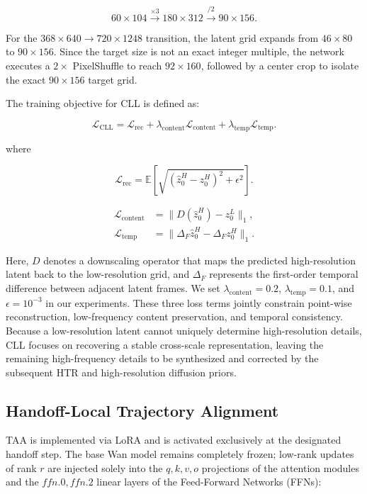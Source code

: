 \[
60\times104 \xrightarrow{\times3} 180\times312
\xrightarrow{/2} 90\times156.
\]

For the \(368\times640 \rightarrow 720\times1248\) transition, the
latent grid expands from \(46\times80\) to \(90\times156\). Since the
target size is not an exact integer multiple, the network executes a
\(2\times\) PixelShuffle to reach \(92\times160\), followed by a center
crop to isolate the exact \(90\times156\) target grid.

The training objective for CLL is defined as:

\[
\mathcal L_{\mathrm{CLL}}=\mathcal L_{\mathrm{rec}}
+\lambda_{\mathrm{content}}\mathcal L_{\mathrm{content}}
+\lambda_{\mathrm{temp}}\mathcal L_{\mathrm{temp}}.
\]

where

\[
\mathcal L_{\mathrm{rec}}
=\mathbb E\left[\sqrt{(\widehat z_0^H-z_0^H)^2+\epsilon^2}\right].
\]

\begin{align}
\mathcal L_{\mathrm{content}}
&=\lVert D(\widehat z_0^H)-z_0^L\rVert_1,\\
\mathcal L_{\mathrm{temp}}
&=\lVert\Delta_F\widehat z_0^H-\Delta_Fz_0^H\rVert_1.
\end{align}

Here, \(D\) denotes a downscaling operator that maps the predicted
high-resolution latent back to the low-resolution grid, and \(\Delta_F\)
represents the first-order temporal difference between adjacent latent
frames. We set \(\lambda_{\mathrm{content}}=0.2\),
\(\lambda_{\mathrm{temp}}=0.1\), and \(\epsilon=10^{-3}\) in our
experiments. These three loss terms jointly constrain point-wise
reconstruction, low-frequency content preservation, and temporal
consistency. Because a low-resolution latent cannot uniquely determine
high-resolution details, CLL focuses on recovering a stable cross-scale
representation, leaving the remaining high-frequency details to be
synthesized and corrected by the subsequent HTR and high-resolution
diffusion priors.

\subsection{Handoff-Local Trajectory Alignment}

TAA is implemented via LoRA \citep{hu2022lora} and is activated
exclusively at the designated handoff step. The base Wan model remains
completely frozen; low-rank updates of rank \(r\) are injected solely
into the \(q, k, v, o\) projections of the attention modules and the
\(ffn.0, ffn.2\) linear layers of the Feed-Forward Networks (FFNs):

